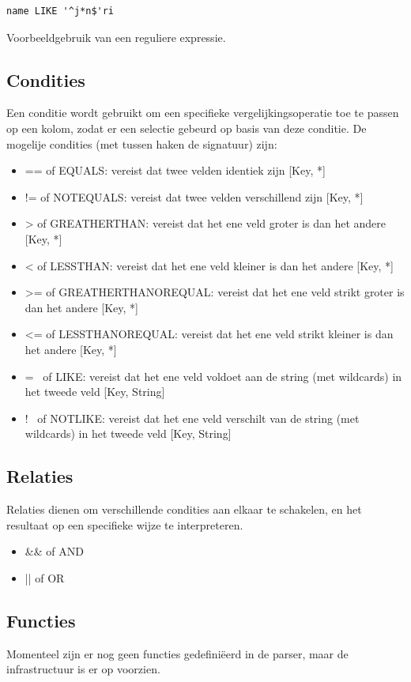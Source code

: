 \begin{code}
\begin{verbatim}
name LIKE '^j*n$'ri
\end{verbatim}
\caption{Voorbeeldgebruik van een reguliere expressie.}
\end{code}


\subsection{Condities}

Een conditie wordt gebruikt om een specifieke vergelijkingsoperatie toe te passen op een kolom, zodat er een selectie gebeurd op basis van deze conditie. De mogelije condities (met tussen haken de signatuur) zijn:

\begin{itemize}
\item == of EQUALS: vereist dat twee velden identiek zijn [Key, *]
\item != of NOTEQUALS: vereist dat twee velden verschillend zijn [Key, *]
\item > of GREATHERTHAN: vereist dat het ene veld groter is dan het andere [Key, *]
\item < of LESSTHAN: vereist dat het ene veld kleiner is dan het andere [Key, *]
\item >= of GREATHERTHANOREQUAL: vereist dat het ene veld strikt groter is dan het andere [Key, *]
\item <= of LESSTHANOREQUAL: vereist dat het ene veld strikt kleiner is dan het andere [Key, *]
\item =~ of LIKE: vereist dat het ene veld voldoet aan de string (met wildcards) in het tweede veld [Key, String]
\item !~ of NOTLIKE: vereist dat het ene veld verschilt van de string (met wildcards) in het tweede veld [Key, String]
\end{itemize}

\subsection{Relaties}

Relaties dienen om verschillende condities aan elkaar te schakelen, en het resultaat op een specifieke wijze te interpreteren.

\begin{itemize}
\item \&\& of AND
\item || of OR
\end{itemize}

\subsection{Functies}

Momenteel zijn er nog geen functies gedefini\"eerd in de parser, maar de infrastructuur is er op voorzien.


